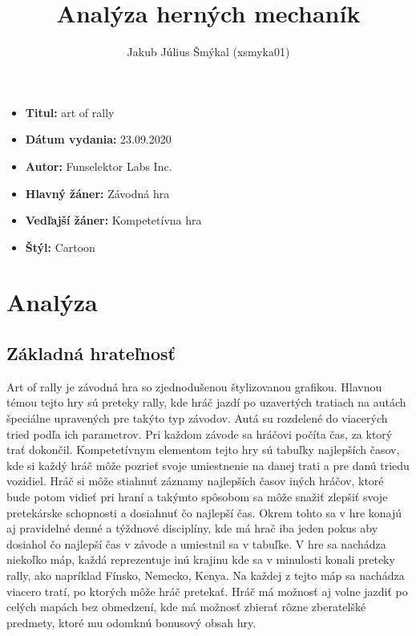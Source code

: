 \documentclass[a4paper,10pt,slovak]{article}
\title{%
Analýza herných mechaník%
}
\author{%
Jakub Július Šmýkal (xsmyka01)%
}
\date{}
\begin{document}
\maketitle
\thispagestyle{empty}

{%
\large

\begin{itemize}

\item[] \textbf{Titul:} art of rally

\item[] \textbf{Dátum vydania:} 23.09.2020

\item[] \textbf{Autor:} Funselektor Labs Inc.

\item[] \textbf{Hlavný žáner:} Závodná hra

\item[] \textbf{Vedľajší žáner:} Kompetetívna hra

\item[] \textbf{Štýl:} Cartoon

\end{itemize}

}

\section*{\centering Analýza}

\subsection*{Základná hrateľnosť}

Art of rally je závodná hra so zjednodušenou štylizovanou grafikou. Hlavnou témou tejto hry sú preteky rally, kde hráč jazdí po uzavertých tratiach na autách špeciálne upravených pre takýto typ závodov. Autá su rozdelené do viacerých tried podľa ich parametrov. Pri každom závode sa hráčovi počíta čas, za ktorý trať dokončil. Kompetetívnym elementom tejto hry sú tabuľky najlepších časov, kde si každý hráč môže pozrieť svoje umiestnenie na danej trati a pre danú triedu vozidiel. Hráč si môže stiahnuť záznamy najlepších časov iných hráčov, ktoré bude potom vidieť pri hraní a takýmto spôsobom sa môže snažiť zlepšiť svoje pretekárske schopnosti a dosiahnuť čo najlepší čas. Okrem tohto sa v hre konajú aj pravidelné denné a týždnové disciplíny, kde má hrač iba jeden pokus aby dosiahol čo najlepší čas v závode a umiestnil sa v tabuľke. V hre sa nachádza niekoľko máp, každá reprezentuje inú krajinu kde sa v minulosti konali preteky rally, ako napríklad Fínsko, Nemecko, Kenya. Na každej z tejto máp sa nachádza viacero tratí, po ktorých môže hráč pretekať. Hráč má možnosť aj volne jazdiť po celých mapách bez obmedzení, kde má možnosť zbierať rôzne zberatelšké predmety, ktoré mu odomknú bonusový obsah hry.
\end{document}
